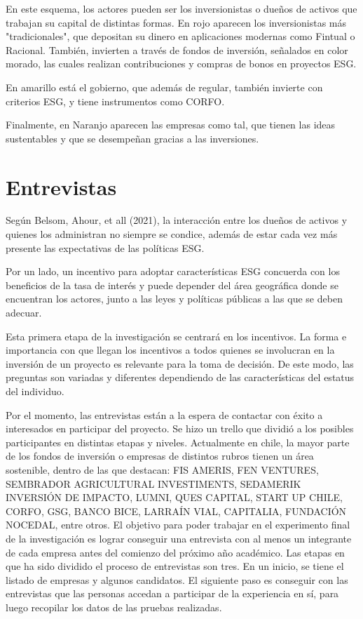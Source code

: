 \documentclass[11pt,letterpaper]{article}
\begin{document}
En este esquema, los actores pueden ser los inversionistas o dueños de activos que trabajan su capital de distintas formas. En rojo aparecen los inversionistas más "tradicionales", que depositan su dinero en aplicaciones modernas como Fintual o Racional. También, invierten a través de fondos de inversión, señalados en color morado, las cuales realizan contribuciones y compras de bonos en proyectos ESG.

En amarillo está el gobierno, que además de regular, también invierte con criterios ESG, y tiene instrumentos como CORFO. 

Finalmente, en Naranjo aparecen las empresas como tal, que tienen las ideas sustentables y que se desempeñan gracias a las inversiones.



\section{Entrevistas}

Según Belsom, Ahour, et all (2021), la interacción entre los dueños de activos y quienes los administran no siempre se condice, además de estar cada vez más presente las expectativas de las políticas ESG.

Por un lado, un incentivo para adoptar características ESG concuerda con los beneficios de la tasa de interés y puede depender del área geográfica donde se encuentran los actores, junto a las leyes y políticas públicas a las que se deben adecuar. 

Esta primera etapa de la investigación se centrará en los incentivos. La forma e importancia con que llegan los incentivos a todos quienes se involucran en la inversión de un proyecto es relevante para la toma de decisión. De este modo, las preguntas son variadas y diferentes dependiendo de las características del estatus del individuo.

Por el momento, las entrevistas están a la espera de contactar con éxito a interesados en participar del proyecto. Se hizo un trello que dividió a los posibles participantes en distintas etapas y niveles.
Actualmente en chile, la mayor parte de los fondos de inversión o empresas de distintos rubros tienen un área sostenible, dentro de las que destacan: FIS AMERIS, FEN VENTURES, SEMBRADOR AGRICULTURAL INVESTIMENTS, SEDAMERIK INVERSIÓN DE IMPACTO, LUMNI, QUES CAPITAL, START UP CHILE, CORFO, GSG, BANCO BICE, LARRAÍN VIAL, CAPITALIA, FUNDACIÓN NOCEDAL, entre otros. El objetivo para poder trabajar en el experimento final de la investigación es lograr conseguir una entrevista con al menos un integrante de cada empresa antes del comienzo del próximo año académico.
Las etapas en que ha sido dividido el proceso de entrevistas son tres. En un inicio, se tiene el listado de empresas y algunos candidatos. El siguiente paso es conseguir con las entrevistas que las personas accedan a participar de la experiencia en sí, para luego recopilar los datos de las pruebas realizadas. 
\end{document}
